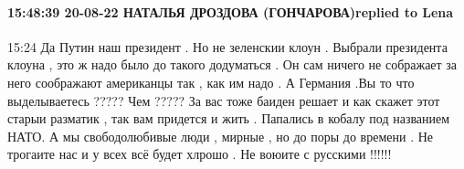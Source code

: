  
 
 
 
 


\paragraph{15:48:39 20-08-22 НАТАЛЬЯ ДРОЗДОВА (ГОНЧАРОВА)replied to Lena}

15:24
Да Путин наш президент .
Но не зеленскии клоун .
Выбрали президента клоуна , это ж надо было до такого додуматься .
Он сам ничего не сображает за него соображают американцы так , как им надо .
А Германия .Вы то что выделываетесь ????? Чем ?????
За вас тоже баиден решает и как скажет этот старыи разматик , так вам придется и жить .
Папались в кобалу под названием НАТО.
А мы свободолюбивые люди , мирные , но до поры до времени .
Не трогаите нас и у всех всё будет хлрошо .
Не воюите с русскими !!!!!!
